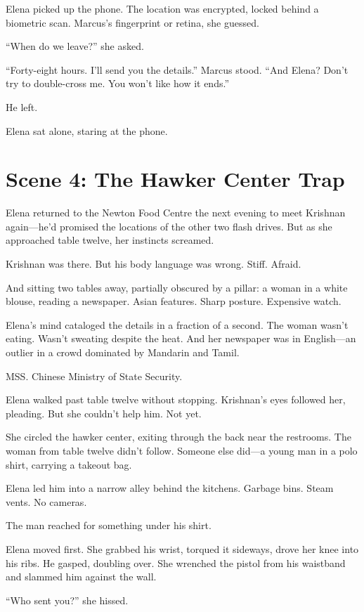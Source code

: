 \documentclass[12pt,oneside]{book}
\begin{document}
Elena picked up the phone. The location was encrypted, locked behind a biometric scan. Marcus's fingerprint or retina, she guessed.

``When do we leave?'' she asked.

``Forty-eight hours. I'll send you the details.'' Marcus stood. ``And Elena? Don't try to double-cross me. You won't like how it ends.''

He left.

Elena sat alone, staring at the phone.

\section*{Scene 4: The Hawker Center Trap}

Elena returned to the Newton Food Centre the next evening to meet Krishnan again—he'd promised the locations of the other two flash drives. But as she approached table twelve, her instincts screamed.

Krishnan was there. But his body language was wrong. Stiff. Afraid.

And sitting two tables away, partially obscured by a pillar: a woman in a white blouse, reading a newspaper. Asian features. Sharp posture. Expensive watch.

Elena's mind cataloged the details in a fraction of a second. The woman wasn't eating. Wasn't sweating despite the heat. And her newspaper was in English—an outlier in a crowd dominated by Mandarin and Tamil.

MSS. Chinese Ministry of State Security.

Elena walked past table twelve without stopping. Krishnan's eyes followed her, pleading. But she couldn't help him. Not yet.

She circled the hawker center, exiting through the back near the restrooms. The woman from table twelve didn't follow. Someone else did—a young man in a polo shirt, carrying a takeout bag.

Elena led him into a narrow alley behind the kitchens. Garbage bins. Steam vents. No cameras.

The man reached for something under his shirt.

Elena moved first. She grabbed his wrist, torqued it sideways, drove her knee into his ribs. He gasped, doubling over. She wrenched the pistol from his waistband and slammed him against the wall.

``Who sent you?'' she hissed.
\end{document}
